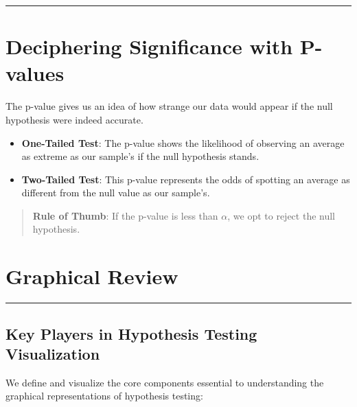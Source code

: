 \documentclass[
  letterpaper,
  DIV=11,
  numbers=noendperiod]{scrartcl}
\begin{document}
\begin{center}\rule{0.5\linewidth}{0.5pt}\end{center}

\hypertarget{deciphering-significance-with-p-values}{%
\section{Deciphering Significance with
P-values}\label{deciphering-significance-with-p-values}}

The p-value gives us an idea of how strange our data would appear if the
null hypothesis were indeed accurate.

\begin{itemize}
\item
  \textbf{One-Tailed Test}: The p-value shows the likelihood of
  observing an average as extreme as our sample's if the null hypothesis
  stands.
\item
  \textbf{Two-Tailed Test}: This p-value represents the odds of spotting
  an average as different from the null value as our sample's.
\end{itemize}

\begin{quote}
\textbf{Rule of Thumb}: If the p-value is less than \(\alpha\), we opt
to reject the null hypothesis.
\end{quote}

\hypertarget{graphical-review}{%
\section{Graphical Review}\label{graphical-review}}

\begin{center}\rule{0.5\linewidth}{0.5pt}\end{center}

\hypertarget{key-players-in-hypothesis-testing-visualization}{%
\subsection{Key Players in Hypothesis Testing
Visualization}\label{key-players-in-hypothesis-testing-visualization}}

We define and visualize the core components essential to understanding
the graphical representations of hypothesis testing:
\end{document}

